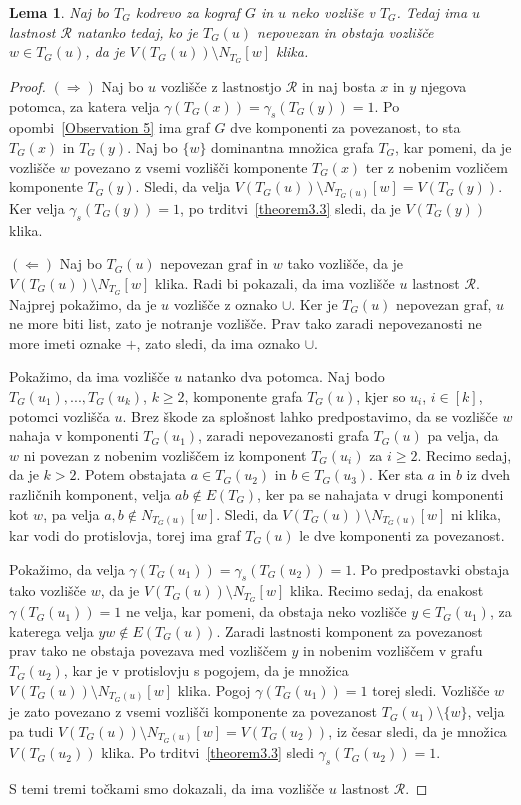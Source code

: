 \documentclass[12pt,a4paper,twoside]{article}
\theoremstyle{definition} %
\theoremstyle{plain} %
\newtheorem{lema}[definicija]{Lema}
\numberwithin{equation}{section}  %
\begin{document}
\begin{lema}\label{Lema1}
Naj bo $T_G$ kodrevo za kograf $G$ in $u$ neko vozliše v $T_G$. Tedaj ima $u$ lastnost $\mathcal{R}$ natanko tedaj, ko je $T_G(u)$ nepovezan in obstaja vozlišče $w\in T_G(u)$, da je $V(T_G(u)) \setminus N_{T_G}[w]$ klika.
\end{lema}
\begin{proof}
$(\Rightarrow)$ Naj bo $u$ vozlišče z lastnostjo $\mathcal{R}$ in naj bosta $x$ in $y$ njegova potomca, za katera velja $\gamma(T_G(x)) = \gamma_s(T_G(y)) = 1$. Po opombi~\ref{Observation 5} ima graf $G$ dve komponenti za povezanost, to sta $T_G(x)$ in $T_G(y)$. Naj bo $\{w\}$ dominantna množica grafa $T_G$, kar pomeni, da je vozlišče $w$ povezano z vsemi vozlišči komponente $T_G(x)$ ter z nobenim vozličem komponente $T_G(y)$. Sledi, da velja $V(T_G(u)) \setminus N_{T_G(u)}[w] = V(T_G(y))$. Ker velja $\gamma_s(T_G(y))=1$, po trditvi~\ref{theorem3.3} sledi, da je $V(T_G(y))$ klika. 

\medskip
$(\Leftarrow)$ Naj bo $T_G(u)$ nepovezan graf in $w$ tako vozlišče, da je $V(T_G(u)) \setminus N_{T_G}[w]$ klika. Radi bi pokazali, da ima vozlišče $u$ lastnost $\mathcal{R}$.
Najprej pokažimo, da je $u$ vozlišče z oznako $\cup$. Ker je $T_G(u)$ nepovezan graf, $u$ ne more biti list, zato je notranje vozlišče. Prav tako zaradi nepovezanosti ne more imeti oznake $+$, zato sledi, da ima oznako $\cup$.

Pokažimo, da ima vozlišče $u$ natanko dva potomca. Naj bodo $T_G(u_1),...,T_G(u_k)$, $k \geq 2$, komponente grafa $T_G(u)$, kjer so $u_i$, $i \in [k]$, potomci vozlišča $u$. Brez škode za splošnost lahko predpostavimo, da se vozlišče $w$ nahaja v komponenti $T_G(u_1)$, zaradi nepovezanosti grafa $T_G(u)$ pa velja, da $w$ ni povezan z nobenim vozliščem iz komponent $T_G(u_i)$ za $i \geq 2$. Recimo sedaj, da je $k > 2$. Potem obstajata $a \in T_G(u_2)$ in $b \in T_G(u_3)$. Ker sta $a$ in $b$ iz dveh različnih komponent, velja $ab \not\in E(T_G)$, ker pa se nahajata v drugi komponenti kot $w$, pa velja $a,b \not\in N_{T_G(u)}[w]$. Sledi, da $V(T_G(u)) \setminus N_{T_G(u)}[w]$ ni klika, kar vodi do protislovja, torej ima graf $T_G(u)$ le dve komponenti za povezanost.

Pokažimo, da velja $\gamma(T_G(u_1)) = \gamma_s(T_G(u_2)) = 1$. Po predpostavki obstaja tako vozlišče $w$, da je $V(T_G(u)) \setminus N_{T_G}[w]$ klika. Recimo sedaj, da enakost $\gamma(T_G(u_1)) = 1$ ne velja, kar pomeni, da obstaja neko vozlišče $y \in T_G(u_1)$, za katerega velja $yw \not\in E(T_G(u))$. Zaradi lastnosti komponent za povezanost prav tako ne obstaja povezava med vozliščem $y$ in nobenim vozliščem v grafu $T_G(u_2)$, kar je v protislovju s pogojem, da je množica $V(T_G(u)) \setminus N_{T_G(u)}[w]$ klika. Pogoj $\gamma(T_G(u_1)) = 1$ torej sledi. Vozlišče $w$ je zato povezano z vsemi vozlišči komponente za povezanost $T_G(u_1) \setminus \{w\}$, velja pa tudi $V(T_G(u)) \setminus N_{T_G(u)}[w] = V(T_G(u_2))$, iz česar sledi, da je množica $V(T_G(u_2))$ klika. Po trditvi~\ref{theorem3.3} sledi $\gamma_s(T_G(u_2)) = 1$.

S temi tremi točkami smo dokazali, da ima vozlišče $u$ lastnost $\mathcal{R}$.
\end{proof}
\end{document}
